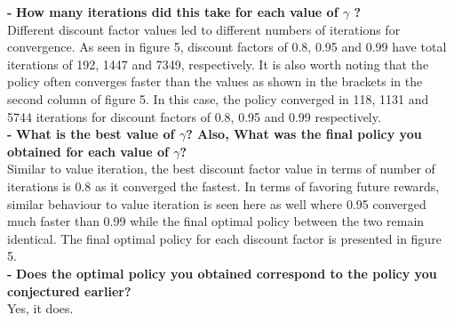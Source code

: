 \documentclass[11pt]{article}
\begin{document}
\noindent
\textbf{-}
\noindent
\textbf{How many iterations did this take for each value of $\gamma$ ?}
\\

\noindent
Different discount factor values led to different numbers of iterations for
convergence. As seen in figure 5, discount factors of 0.8, 0.95 and 0.99 have
total iterations of 192, 1447 and 7349, respectively. It is also worth noting
that the policy often converges faster than the values as shown in the brackets
in the second column of figure 5. In this case, the policy converged in 118,
1131 and 5744 iterations for discount factors of 0.8, 0.95 and 0.99
respectively. \\

\noindent
\textbf{-}
\noindent
\textbf{What is the best value of $\gamma$? Also, What was the final policy you
obtained for each value of $\gamma$?}
\\

\noindent
Similar to value iteration, the best discount factor value in terms of number of
iterations is 0.8 as it converged the fastest. In terms of favoring future
rewards, similar behaviour to value iteration is seen here as well where 0.95
converged much faster than 0.99 while the final optimal policy between the two
remain identical. The final optimal policy for each discount factor is presented
in figure 5. \\

\noindent
\textbf{-}
\noindent
\textbf{Does the optimal policy you obtained correspond to the policy you
conjectured earlier?}
\\

\noindent
Yes, it does.
\\
\end{document}
